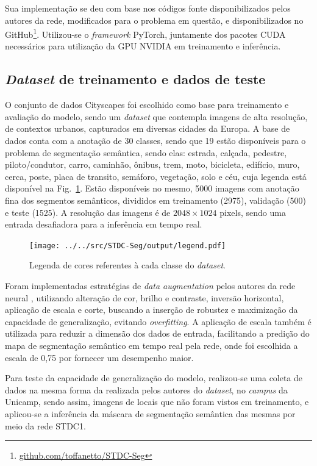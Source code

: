 \documentclass[conference]{IEEEtran}
\begin{document}
Sua implementação se deu com base nos códigos fonte disponibilizados pelos autores da rede, modificados para o problema em questão, e disponibilizados no GitHub\footnote{\href{https://github.com/toffanetto/STDC-Seg}{github.com/toffanetto/STDC-Seg}}. Utilizou-se o \textit{framework} PyTorch, juntamente dos pacotes CUDA necessários para utilização da GPU NVIDIA em treinamento e inferência.


\subsection{\textit{Dataset} de treinamento e dados de teste}

O conjunto de dados Cityscapes \cite{cordts2016CityscapesDatasetSemantic} foi escolhido como base para treinamento e avaliação do modelo, sendo um \textit{dataset} que contempla imagens de alta resolução, de contextos urbanos, capturados em diversas cidades da Europa. A base de dados conta com a anotação de 30 classes, sendo que 19 estão disponíveis para o problema de segmentação semântica, sendo elas: estrada, calçada, pedestre, piloto/condutor, carro, caminhão, ônibus, trem, moto, bicicleta, edifício, muro, cerca, poste, placa de transito, semáforo, vegetação, solo e céu, cuja legenda está disponível na Fig.~\ref{fig:legend}. Estão disponíveis no mesmo, 5000 imagens com anotação fina dos segmentos semânticos, divididos em treinamento (2975), validação (500) e teste (1525). A resolução das imagens é de $2048 \times 1024$ pixels, sendo uma entrada desafiadora para a inferência em tempo real.

\begin{figure}[h!]
	\centering
	\texttt{[image: ../../src/STDC-Seg/output/legend.pdf]}
	\caption{Legenda de cores referentes à cada classe do \textit{dataset}.}
	\label{fig:legend}
\end{figure}

Foram implementadas estratégias de \textit{data augmentation} pelos autores da rede neural \cite{fan2021RethinkingBiSeNetRealtime}, utilizando alteração de cor, brilho e contraste, inversão horizontal, aplicação de escala e corte, buscando a inserção de robustez e maximização da capacidade de generalização, evitando \textit{overfitting}. A aplicação de escala também é utilizada para reduzir a dimensão dos dados de entrada, facilitando a predição do mapa de segmentação semântico em tempo real pela rede, onde foi escolhida a escala de 0,75 por fornecer um desempenho maior.

Para teste da capacidade de generalização do modelo, realizou-se uma coleta de dados na mesma forma da realizada pelos autores do \textit{dataset}, no \textit{campus} da Unicamp, sendo assim, imagens de locais que não foram vistos em treinamento, e aplicou-se a inferência da máscara de segmentação semântica das mesmas por meio da rede STDC1.
\end{document}
